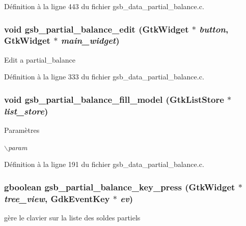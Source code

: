 Définition à la ligne 443 du fichier gsb\_\-data\_\-partial\_\-balance.c.

\subsubsection[{gsb\_\-partial\_\-balance\_\-edit}]{\setlength{\rightskip}{0pt plus 5cm}void gsb\_\-partial\_\-balance\_\-edit (GtkWidget $\ast$ {\em button}, \/  GtkWidget $\ast$ {\em main\_\-widget})}\label{gsb__data__partial__balance_8c_a2136465d129225b7cfef720d0880af2d}
Edit a partial\_\-balance 

Définition à la ligne 333 du fichier gsb\_\-data\_\-partial\_\-balance.c.

\subsubsection[{gsb\_\-partial\_\-balance\_\-fill\_\-model}]{\setlength{\rightskip}{0pt plus 5cm}void gsb\_\-partial\_\-balance\_\-fill\_\-model (GtkListStore $\ast$ {\em list\_\-store})}\label{gsb__data__partial__balance_8c_a3ad14b86fa26a4473be2c400d0dcb9e3}

\begin{DoxyParams}{Paramètres}
\item[{\em $\backslash$param}]\end{DoxyParams}


Définition à la ligne 191 du fichier gsb\_\-data\_\-partial\_\-balance.c.

\subsubsection[{gsb\_\-partial\_\-balance\_\-key\_\-press}]{\setlength{\rightskip}{0pt plus 5cm}gboolean gsb\_\-partial\_\-balance\_\-key\_\-press (GtkWidget $\ast$ {\em tree\_\-view}, \/  GdkEventKey $\ast$ {\em ev})}\label{gsb__data__partial__balance_8c_a76a78a9bfc49e4215ddbdd12c9de66a7}
gère le clavier sur la liste des soldes partiels 

